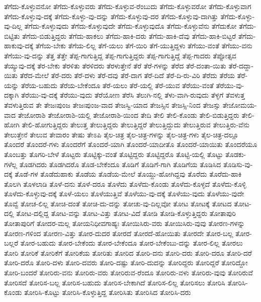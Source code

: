 {ತೆಗೆದು-ಕೊಳ್ಳುವನೋ
ತೆಗೆದು-ಕೊಳ್ಳುವರು
ತೆಗೆದು-ಕೊಳ್ಳುವ-ರೆಂಬುದು
ತೆಗೆದು-ಕೊಳ್ಳುವರೋ
ತೆಗೆದು-ಕೊಳ್ಳುವಾಗ
ತೆಗೆದು-ಕೊಳ್ಳುವು-ದಕ್ಕೆ
ತೆಗೆದು-ಕೊಳ್ಳು-ವು-ದನ್ನು
ತೆಗೆದು-ಕೊಳ್ಳುವು-ದರ
ತೆಗೆದು-ಕೊಳ್ಳುವು-ದಾಗಿತ್ತು
ತೆಗೆದು-ಕೊಳ್ಳು-ವು-ದಿಲ್ಲ
ತೆಗೆದು-ಕೊಳ್ಳುವುದು
ತೆಗೆದು-ಕೊಳ್ಳುವುದೇ
ತೆಗೆದು-ಕೊಳ್ಳುವುದೊ
ತೆಗೆದು-ಕೊಳ್ಳುವೆನು
ತೆಗೆದುಕೋ
ತೆಗೆದು-ಬಿಟ್ಟಿತು
ತೆಗೆದು-ಬಿಡುತ್ತಿದ್ದರು
ತೆಗೆದು-ಹಾಕಲು
ತೆಗೆದು-ಹಾಕಿ-ದರು
ತೆಗೆದು-ಹಾಕಿ-ದೆವು
ತೆಗೆದು-ಹಾಕಿ-ಬಿಟ್ಟರೆ
ತೆಗೆದು-ಹಾಕುವು-ದಕ್ಕೆ
ತೆಗೆಯ-ಬೇಕು
ತೆಗೆಯ-ಲಿಲ್ಲ
ತೆಗೆ-ಯಲು
ತೆಗೆ-ಯಿರಿ
ತೆಗೆ-ಯುತ್ತಿದ್ದಳು
ತೆಗೆಯು-ವಂತೆ
ತೆಗೆಯು-ವನು
ತೆಗೆಯು-ವು-ದನ್ನು
ತೆತ್ತ
ತೆತ್ತೇ
ತೆಪ್ಪ-ಗಾಗುತ್ತಿದ್ದ
ತೆಪ್ಪ-ಗಾಗುತ್ತಿದ್ದರು
ತೆಪ್ಪ-ಗಾಗುತ್ತಿದ್ದೆ
ತೆಪ್ಪ-ಗಾದರು
ತೆಪ್ಪೋತ್ಸವ
ತೆಯ್ಯುವು-ದಕ್ಕೆ
ತೆರ-ಬೇಕು
ತೆರಳಿತು
ತೆರಳಿದರು
ತೆರಳುತ್ತೇನೆ
ತೆರೆ
ತೆರೆ-ಗಳನ್ನು
ತೆರೆದ
ತೆರೆ-ದಂತಾ-ಯಿತು
ತೆರೆ-ದದ್ದಾ-ಯಿತು
ತೆರೆದ-ಮೇಲೆ
ತೆರೆ-ದರು
ತೆರೆ-ದಳು
ತೆರೆ-ದವು
ತೆರೆ-ದಾಗ
ತೆರೆ-ದಿದೆ
ತೆರೆ-ದಿ-ರು-ವಿರಿ
ತೆರೆದು
ತೆರೆಯ
ತೆರೆ-ಯನ್ನು
ತೆರೆಯ-ಬಹುದು
ತೆರೆಯ-ಬೇಕೆಂದೂ
ತೆರೆ-ಯಲು
ತೆರೆ-ಯಲ್ಲಿ
ತೆರೆ-ಯುವ
ತೆರೆಯು-ವಂತೆ
ತೆರೆಯು-ವು-ದಕ್ಕಾಗಿ
ತೆರೆಯು-ವು-ದಕ್ಕೆ
ತೆರೆಯು-ವುದು
ತೆರೆಯೋಣ
ತೆರೆಸಿ
ತೆಲುಗಿ-ನಲ್ಲಿ
ತೆಳು-ವಾಗಿ-ರುವುದು
ತೆಳ್ಳಗೆ
ತೆವಳುತ್ತ
ತೆವಳುತ್ತಿರುವ
ತೇ
ತೇಜಃಪುಂಜ
ತೇಜಃಪುಂಜ-ವಾದ
ತೇಜಸ್ವಿ-ಯಾದ
ತೇಜಸ್ಸಿನ
ತೇಜಸ್ಸಿ-ನಿಂದ
ತೇಜಸ್ಸು
ತೇಜೋಮಯ-ವಾದ
ತೇಜೋರಾಶಿ
ತೇಜೋರಾಶಿ-ಯಲ್ಲಿ
ತೇಜೋರಾಶಿ-ಯಿಂದ
ತೇದಿ
ತೇಲಿ
ತೇಲಿ-ಕೊಂಡು
ತೇಲಿ-ಬಿಡುತ್ತಿದ್ದರು
ತೇಲಿ-ಹೋಗಿ
ತೇಲಿ-ಹೋಗುತ್ತಿದ್ದರು
ತೇಲುತ್ತ
ತೇಲುತ್ತಿದ್ದರು
ತೇಲುತ್ತಿದ್ದರೆ
ತೇಲುತ್ತಿದ್ದುದು
ತೇಲುತ್ತಿರುವ
ತೇಲುತ್ತಿರು-ವೆನು
ತೇಲುತ್ತೇನೆ
ತೇಲುವ
ತೇವಾರಂ
ತೇಷು
ತೇಽಪಿ
ತೈಲ-ಚಿತ್ರ
ತೈಲ-ಚಿತ್ರ-ಗಳನ್ನು
ತೈಲ-ಚಿತ್ರ-ಗಳು
ತೈಲ-ಚಿತ್ರ-ದಲ್ಲೂ
ತೊಂದರೆ
ತೊಂದರೆ-ಗಳು
ತೊಂದರೆಗೆ
ತೊಂದರೆ-ಯಾಗಿ
ತೊಂದರೆ-ಯಾದೀತೊ
ತೊಂದರೆ-ಯಾಯಿತು
ತೊಂದರೆಯೂ
ತೊಂಬತ್ತು
ತೊಗರಿ-ಬೇಳೆ
ತೊಟ್ಟರು
ತೊಟ್ಟಿಕ್ಕು-ವಂತೆ
ತೊಟ್ಟಿದ್ದರು
ತೊಟ್ಟಿದ್ದರೊ
ತೊಟ್ಟಿ-ಯಲ್ಲಿ
ತೊಟ್ಟು
ತೊಡಕು-ಗಳೆಲ್ಲ
ತೊಡಗಿದರು
ತೊಡಗಿದರೊ
ತೊಡ-ಬೇಕೆಂದೂ
ತೊಡಿಗೆ
ತೊಡಿಗೆ-ಗಾಗಿ
ತೊಡಿಗೆಯ
ತೊಡಿಸಿದ
ತೊಡಿಸು-ವು-ದಕ್ಕೆ
ತೊಡೆ-ಗಳ
ತೊಡೆದುಹಾಕು
ತೊಡೆಯ
ತೊಡೆಯ-ಮೇಲೆ
ತೊಯ್ದು-ಹೋಗಿದ್ದವು
ತೊರೆದು
ತೊರೆದು-ಹಾಕಿ
ತೊಲಗಿ
ತೊಳಲಾಡಿ
ತೊಳೆ-ದನು
ತೊಳೆ-ದರೂ
ತೊಳೆದು
ತೊಳೆದು-ಕೊಂಡು
ತೊಳೆದು-ಕೊಳ್ಳದೆ
ತೊಳೆದು-ಕೊಳ್ಳಿ
ತೊಳೆದು-ಕೊಳ್ಳುವು-ದಕ್ಕೆ
ತೊಳೆ-ಯಲು
ತೊಳೆಯುತ್ತಿವೆ
ತೊಳೆಯು-ವು-ದಕ್ಕೆ
ತೊಳೆಯು-ವುದು
ತೊಳೆಯು-ವುದೇ
ತೊವ್ವೆ
ತೋಚ-ಲಿಲ್ಲ
ತೋಚಿ-ದಂತೆ
ತೋಚಿ-ದು-ದನ್ನು
ತೋಚು-ವು-ದಿಲ್ಲವೋ
ತೋಟ
ತೋಟಕ್ಕೆ
ತೋಟದ
ತೋಟ-ದಲ್ಲಿ
ತೋಟ-ದಲ್ಲಿದ್ದ
ತೋಟ-ವನ್ನು
ತೋಟ-ವಿತ್ತು
ತೋಟ-ವಿದೆ
ತೋಡಿ
ತೋಡಿ-ಕೊಳ್ಳುತ್ತಿದ್ದರು
ತೋತಾಪುರಿ
ತೋತಾಪುರಿಗೆ
ತೋದರ-ಮಲ್ಲ
ತೋಯನಿಧೀವಗಾಹ್ಯಃ
ತೋಯಿಸಿರು-ವರು
ತೋಯಿಸಿರು-ವುವು
ತೋರಣ-ಗಳನ್ನು
ತೋರಣ-ಗಳಿಂದ
ತೋರಣ-ವಿತ್ತು
ತೋರ-ದುದರ
ತೋರದೆ
ತೋರದೆ-ಹೋಯಿತು
ತೋರದೇ
ತೋರ-ಬಲ್ಲ
ತೋರ-ಬಲ್ಲರೆ
ತೋರ-ಬಹುದು
ತೋರ-ಬೇಕೆಂದು
ತೋರ-ಬೇಕೆಂದೂ
ತೋರ-ಬೇಕೆಂಬು-ದನ್ನು
ತೋರ-ಲಿಲ್ಲ
ತೋರಲು
ತೋರಿ
ತೋರಿಕೆ
ತೋರಿಕೆಗೆ
ತೋರಿಕೆಯ
ತೋರಿತು
ತೋರಿದ
ತೋರಿ-ದನು
ತೋರಿ-ದರು
ತೋರಿ-ದರೂ
ತೋರಿ-ದರೆ
ತೋರಿ-ದರೊ
ತೋರಿ-ದಳು
ತೋರಿ-ದವರು
ತೋರಿ-ದಷ್ಟು
ತೋರಿ-ದುದನ್ನು
ತೋರಿದ್ದರು
ತೋರಿದ್ದರೆ
ತೋರಿದ್ದೋ
ತೋರಿ-ಬಂದರೆ
ತೋರಿರು-ವನು
ತೋರಿರು-ವರು
ತೋರಿರುವ-ರೆಂದೂ
ತೋರಿರು-ವಳು
ತೋರಿರು-ವುವು
ತೋರಿರುವೆ
ತೋರಿಸದೆ
ತೋರಿಸ-ಬಲ್ಲ
ತೋರಿಸ-ಬಹುದು
ತೋರಿಸ-ಬೇಕಾಗಿದೆ
ತೋರಿಸ-ಲಿಲ್ಲ
ತೋರಿಸಲು
ತೋರಿಸಿ
ತೋರಿಸಿ-ಕೊಂಡು
ತೋರಿಸಿ-ಕೊಟ್ಟು
ತೋರಿಸಿ-ಕೊಳ್ಳುತ್ತಿದ್ದ
ತೋರಿಸಿತು
ತೋರಿಸಿದ
ತೋರಿಸಿ-ದರು
}

